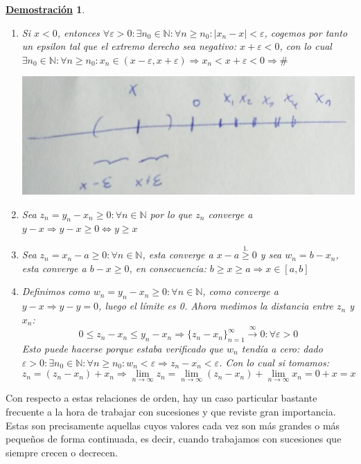 \documentclass[10pt,a4paper,openright]{book}
\theoremstyle{break}
\newtheorem*{demo}{\underline{Demostración}}
\begin{document}
\begin{demo}
\begin{enumerate}
\item Si $x<0$, entonces $\forall \varepsilon >0: \exists n_0\in \mathbb N: \forall n\geq n_0: |x_n-x|<\varepsilon$, cogemos por tanto un epsilon tal que el extremo derecho sea negativo: $x+\varepsilon<0$, con lo cual $\exists n_0\in \mathbb N: \forall n \geq n_0: x_n\in (x-\varepsilon,x+\varepsilon)\Rightarrow x_n<x+\varepsilon<0\Rightarrow \#$

\begin{center}
\includegraphics[scale=0.25]{limite negativo}
\end{center}

\item Sea $z_n=y_n-x_n\geq 0: \forall n\in \mathbb N$ por lo que $z_n$ converge a $y-x\Rightarrow y-x\geq 0\Leftrightarrow y\geq x$

\item Sea $z_n=x_n-a\geq 0: \forall n \in \mathbb N$, esta converge a $x-a\stackrel{1.}{\geq}0$ y sea $w_n=b-x_n$, esta converge a $b-x\geq 0$, en consecuencia: $b\geq x\geq a\Rightarrow x\in [a,b]$

\item Definimos como $w_n=y_n-x_n\geq 0: \forall n \in \mathbb N$, como converge a $y-x\Rightarrow y-y=0$, luego el límite es 0. Ahora medimos la distancia entre $z_n$ y $x_n$:
$$0\leq z_n-x_n\leq y_n-x_n\Rightarrow \{z_n-x_n\}_{n=1}^\infty\stackrel{\infty}{\rightarrow} 0: \forall \varepsilon>0$$
Esto puede hacerse porque estaba verificado que $w_n$ tendía a cero: dado $\varepsilon>0: \exists n_0\in \mathbb N: \forall n\geq n_0: w_n<\varepsilon\Rightarrow z_n-x_n<\varepsilon$. Con lo cual si tomamos:
$$z_n=(z_n-x_n)+x_n\Rightarrow \lim_{n\rightarrow \infty} z_n=\lim_{n\rightarrow \infty} (z_n-x_n)+ \lim_{n\rightarrow \infty} x_n=0+x=x$$
\end{enumerate}
\end{demo}

Con respecto a estas relaciones de orden, hay un caso particular bastante frecuente a la hora de trabajar con sucesiones y que reviste gran importancia. Estas son precisamente aquellas cuyos valores cada vez son más grandes o más pequeños de forma continuada, es decir, cuando trabajamos con sucesiones que siempre crecen o decrecen.
\end{document}
